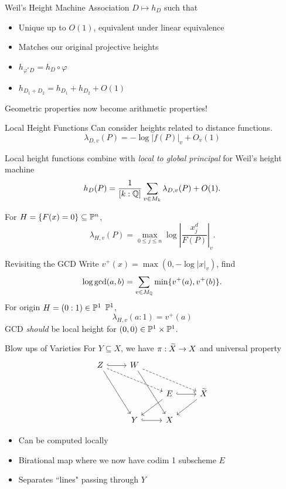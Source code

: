 \documentclass{beamer}
\begin{document}
\begin{frame}{Weil's Height Machine}
    Association $D \mapsto h_D$ such that
    \begin{itemize}
        \item Unique up to $O(1)$, equivalent under linear equivalence
        \item Matches our original projective heights
        \item $h_{\varphi^* D} = h_D \circ \varphi$
        \item $h_{D_1 + D_2} = h_{D_1} + h_{D_2} + O(1)$
    \end{itemize}

    Geometric properties now become arithmetic properties!
\end{frame}

\begin{frame}{Local Height Functions}
    Can consider heights related to distance functions.
    \[
        \lambda_{D, v}(P) = - \log |f(P)|_v + O_v(1)
    \]

    Local height functions combine with \textit{local to global principal} for Weil's height machine
    \[
        h_D(P) = \frac{1}{[k : \mathbb{Q}]} \sum_{v \in M_k} \lambda_{D, v}(P) + O(1).
    \]

    For $H = \{ F(x) = 0 \} \subseteq \mathbb{P}^n$,
    \[
        \lambda_{H,v}(P) = \max_{0 \leq j \leq n} \log \left| \frac{x_j^d}{F(P)} \right|_v.
    \]
\end{frame}

\begin{frame}{Revisiting the GCD}
    Write $v^+(x) = \max(0, - \log |x|_v)$,
    find
    \[
        \log \gcd (a, b) = \sum_{v \in M_{\mathbb{Q}}} \min \{ v^+(a), v^+(b) \}.
    \]
    For origin $H = (0 : 1) \in \mathbb{P}^1$ $\mathbb{P}^1$,
    \[
        \lambda_{H,v}(a : 1) = v^+(a)
    \]
    GCD \textit{should} be local height for $(0, 0) \in \mathbb{P}^1 \times \mathbb{P}^1$.
\end{frame}

\begin{frame}{Blow ups of Varieties}
    For $Y \subseteq X$, we have $\pi : \widetilde X \to X$ and universal property
    \[
        \begin{tikzcd}[ampersand replacement=\&]
            Z \arrow[r, hook] \arrow[ddr] \arrow[drr, dashed] \& W \arrow[ddr] \arrow[drr, dashed] \& \\
            \& \& E \arrow[r, hook] \arrow[dl] \& \wt X \arrow[dl] \\
            \& Y \arrow[r, hook] \& X \&
        \end{tikzcd}
    \]
    \begin{itemize}
        \item Can be computed locally
        \item Birational map where we now have codim 1 subscheme $E$
        \item Separates ``lines" passing through $Y$ 
    \end{itemize}
\end{frame}
\end{document}
